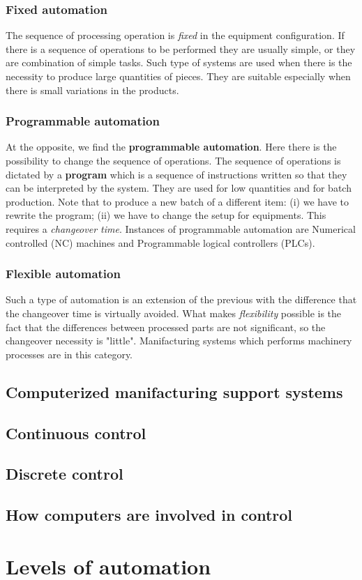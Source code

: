 \subsubsection{Fixed automation}
The sequence of processing operation is \textit{fixed} in the equipment configuration. If there is a sequence of operations to be performed they are usually simple, or they are combination of simple tasks. Such type of systems are used when there is the necessity to produce large quantities of pieces. They are suitable especially when there is small variations in the products.
\subsubsection{Programmable automation}
At the opposite, we find the \textbf{programmable automation}. Here there is the possibility to change the sequence of operations. The sequence of operations is dictated by a \textbf{program} which is a sequence of instructions written so that they can be interpreted by the system. They are used for low quantities and for batch production. Note that to produce a new batch of a different item: (i) we have to rewrite the program; (ii) we have to change the setup for equipments. This requires a \textit{changeover time}. Instances of programmable automation are Numerical controlled (NC) machines and Programmable logical controllers (PLCs).

\subsubsection{Flexible automation}
Such a type of automation is an extension of the previous with the difference that the changeover time is virtually avoided. What makes \textit{flexibility} possible is the fact that the differences between processed parts are not significant, so the changeover necessity is "little". Manifacturing systems which performs machinery processes are in this category.

\subsection{Computerized manifacturing support systems}

\subsection{Continuous control}
\subsection{Discrete control}
\subsection{How computers are involved in control}


\section{Levels of automation}